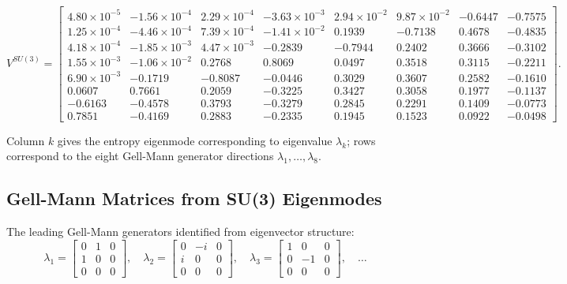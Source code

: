 \documentclass[11pt]{article}
\begin{document}
\begin{equation}
V^{SU(3)} =
\begin{bmatrix}
4.80\!\times\!10^{-5} & -1.56\!\times\!10^{-4} & 2.29\!\times\!10^{-4}
  & -3.63\!\times\!10^{-3} & 2.94\!\times\!10^{-2} & 9.87\!\times\!10^{-2}
  & -0.6447 & -0.7575 \\
1.25\!\times\!10^{-4} & -4.46\!\times\!10^{-4} & 7.39\!\times\!10^{-4}
  & -1.41\!\times\!10^{-2} & 0.1939 & -0.7138 & 0.4678 & -0.4835 \\
4.18\!\times\!10^{-4} & -1.85\!\times\!10^{-3} & 4.47\!\times\!10^{-3}
  & -0.2839 & -0.7944 & 0.2402 & 0.3666 & -0.3102 \\
1.55\!\times\!10^{-3} & -1.06\!\times\!10^{-2} & 0.2768
  & 0.8069 & 0.0497 & 0.3518 & 0.3115 & -0.2211 \\
6.90\!\times\!10^{-3} & -0.1719 & -0.8087
  & -0.0446 & 0.3029 & 0.3607 & 0.2582 & -0.1610 \\
0.0607 & 0.7661 & 0.2059
  & -0.3225 & 0.3427 & 0.3058 & 0.1977 & -0.1137 \\
-0.6163 & -0.4578 & 0.3793
  & -0.3279 & 0.2845 & 0.2291 & 0.1409 & -0.0773 \\
0.7851 & -0.4169 & 0.2883
  & -0.2335 & 0.1945 & 0.1523 & 0.0922 & -0.0498
\end{bmatrix}.
\end{equation}

Column $k$ gives the entropy eigenmode corresponding to
eigenvalue $\lambda_k$; rows correspond to the eight
Gell-Mann generator directions $\lambda_1,\ldots,\lambda_8$.

\subsection{Gell-Mann Matrices from SU(3) Eigenmodes}

The leading Gell-Mann generators identified from eigenvector
structure:
\begin{equation}
  \lambda_1 =
  \begin{bmatrix}0&1&0\\1&0&0\\0&0&0\end{bmatrix}, \quad
  \lambda_2 =
  \begin{bmatrix}0&-i&0\\i&0&0\\0&0&0\end{bmatrix}, \quad
  \lambda_3 =
  \begin{bmatrix}1&0&0\\0&-1&0\\0&0&0\end{bmatrix}, \quad \dots
\end{equation}
\end{document}
